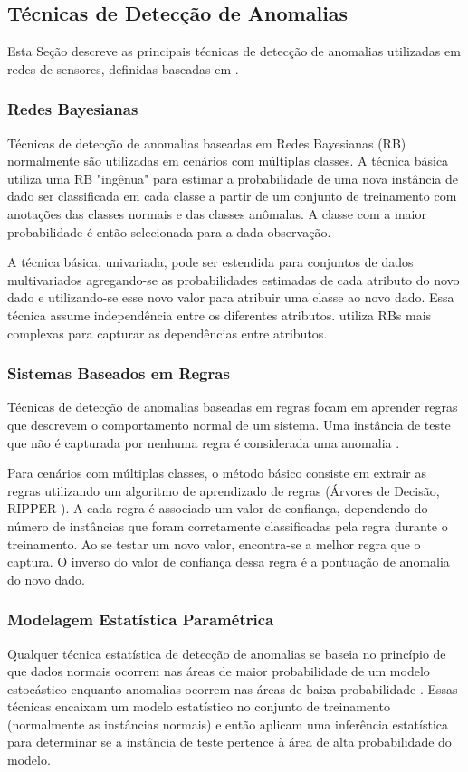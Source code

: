 \documentclass[cic,tc]{iiufrgs}
\begin{document}
\subsection{Técnicas de Detecção de Anomalias}
Esta Seção descreve as principais técnicas de detecção de anomalias utilizadas em redes de sensores, definidas baseadas em \cite{AnomalyDetectionSurvey2009}.

\subsubsection{Redes Bayesianas}
Técnicas de detecção de anomalias baseadas em Redes Bayesianas (RB) normalmente são utilizadas em cenários com múltiplas classes. A técnica básica utiliza uma RB "ingênua" para estimar a probabilidade de uma nova instância de dado ser classificada em cada classe a partir de um conjunto de treinamento com anotações das classes normais e das classes anômalas. A classe com a maior probabilidade é então selecionada para a dada observação.

A técnica básica, univariada, pode ser estendida para conjuntos de dados multivariados agregando-se as probabilidades estimadas de cada atributo do novo dado e utilizando-se esse novo valor para atribuir uma classe ao novo dado. Essa técnica assume independência entre os diferentes atributos. \cite{BayesianBelief} utiliza RBs mais complexas para capturar as dependências entre atributos.

\subsubsection{Sistemas Baseados em Regras}
Técnicas de detecção de anomalias baseadas em regras focam em aprender regras que descrevem o comportamento normal de um sistema. Uma instância de teste que não é capturada por nenhuma regra é considerada uma anomalia \cite{ContextualMichael2014}.

Para cenários com múltiplas classes, o método básico consiste em extrair as regras utilizando um algoritmo de aprendizado de regras (Árvores de Decisão, RIPPER \cite{cohen1995fast}). A cada regra é associado um valor de confiança, dependendo do número de instâncias que foram corretamente classificadas pela regra durante o treinamento. Ao se testar um novo valor, encontra-se a melhor regra que o captura. O inverso do valor de confiança dessa regra é a pontuação de anomalia do novo dado.

\subsubsection{Modelagem Estatística Paramétrica}
Qualquer técnica estatística de detecção de anomalias se baseia no princípio de que dados normais ocorrem nas áreas de maior probabilidade de um modelo estocástico enquanto anomalias ocorrem nas áreas de baixa probabilidade \cite{AnomalyDetectionSurvey2009}. Essas técnicas encaixam um modelo estatístico no conjunto de treinamento (normalmente as instâncias normais) e então aplicam uma inferência estatística para determinar se a instância de teste pertence à área de alta probabilidade do modelo.
\end{document}
